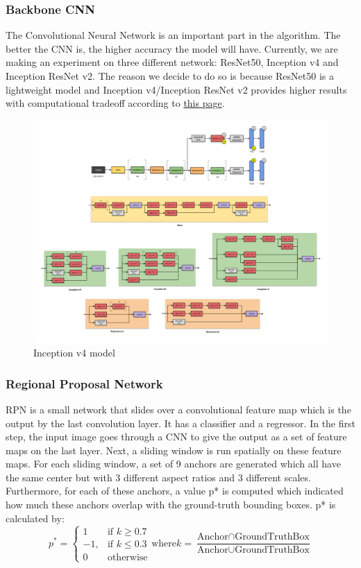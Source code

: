 \subsubsection{Backbone CNN}
    The Convolutional Neural Network is an important part in the algorithm. The better the CNN is, the higher accuracy the model will have. Currently, we are making an experiment on three different network: ResNet50, Inception v4 and Inception ResNet v2. The reason we decide to do so is because ResNet50 is a lightweight model and Inception v4/Inception ResNet v2 provides higher results with computational tradeoff according to \href{https://github.com/alyato/CNN-models-comparison}{this page}.
\begin{figure}[!t]
    \includegraphics[width=14cm]{Images/recognition/Inception_v4.png}
    \caption{Inception v4 model}
    \label{fig: Inception v4}
\end{figure}

\subsubsection{Regional Proposal Network}

    RPN is a small network that slides over a convolutional feature map which is the output by the last convolution layer. It has a classifier and a regressor. In the first step, the input image goes through a CNN to give the  output as a set of feature maps on the last layer. Next, a sliding window is run spatially on these feature maps. For each sliding window, a set of 9 anchors are generated which all have the same center but with 3 different aspect ratios and 3 different scales. Furthermore, for each of these anchors, a value p* is computed which indicated how much these anchors overlap with the ground-truth bounding boxes. p* is calculated by:
    \[
    p^* =
    \begin{cases}
        1       & \text{if } k\ge 0.7\\
        -1,      & \text{if } k\le 0.3\\
        0       & \text{otherwise}
    \end{cases}
    \text{where} k = \frac{\text{Anchor} \cap \text{GroundTruthBox}}{\text{Anchor} \cup \text{GroundTruthBox}}
    \]
    

